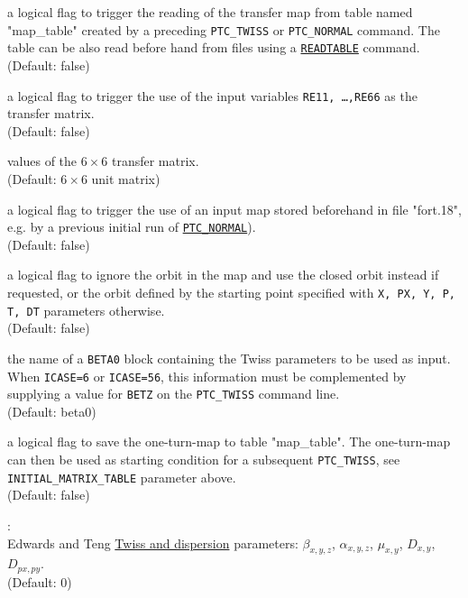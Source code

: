 \begin{madlist}
  a logical flag to trigger the reading of the transfer map from table
  named "map\_table" created by a preceding \texttt{PTC\_TWISS} or
  \texttt{PTC\_NORMAL} command. The table can be also read 
  before hand from files using a \hyperref[sec:readtable]{\texttt{READTABLE}}
  command.\\ 
  (Default: false)
  
  a logical flag to trigger the use of the input variables \texttt{RE11,
    \ldots ,RE66} as the transfer matrix. \\
  (Default: false)

  values of the $6\times 6$ transfer matrix. \\ 
  (Default: $6\times 6$ unit matrix) 
  
  a logical flag to trigger the use of an input map stored beforehand in
  file "fort.18",  e.g. by a previous initial run of
  \hyperref[chap:ptc-normal]{\texttt{PTC\_NORMAL}}). \\
  (Default: false)

  a logical flag to ignore the orbit in the map and use the closed orbit
  instead if requested, or the orbit defined by the starting point
  specified with \texttt{X, PX, Y, P, T, DT} parameters otherwise. \\
  (Default: false)

  the name of a \texttt{BETA0} block containing the Twiss
  parameters to be used as input. When \texttt{ICASE=6} or \texttt{ICASE=56}, 
  this information  must be complemented by supplying a value for \texttt{BETZ} on the
  \texttt{PTC\_TWISS} command line. \\
  (Default: beta0)

  a logical flag to save the one-turn-map to table
  "map\_table". The one-turn-map can then be used as starting condition
  for a subsequent \texttt{PTC\_TWISS}, see \texttt{INITIAL\_MATRIX\_TABLE}
  parameter above. \\ (Default: false)

   : \\
  Edwards and Teng \cite{edwards1973} 
  \hyperref[chap:twiss]{Twiss and dispersion} parameters:  
  $\beta_{x,y,z}$, $\alpha_{x,y,z}$, $\mu_{x,y}$, $D_{x,y}$, $D_{px,py}$.\\
  (Default: 0) 


\end{madlist}
